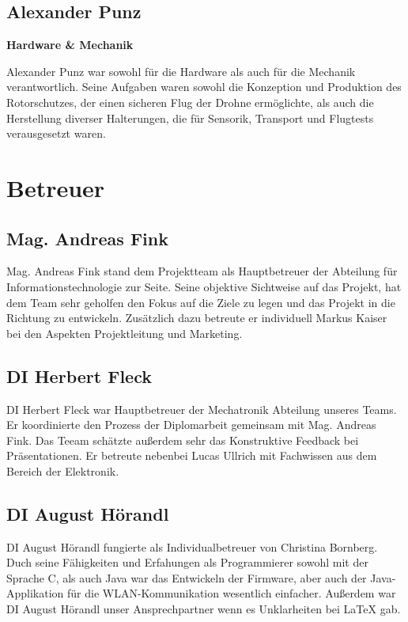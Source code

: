   \subsection*{Alexander Punz}
  \textbf{Hardware \& Mechanik}

  Alexander Punz war sowohl für die Hardware als auch für die Mechanik verantwortlich. Seine Aufgaben waren sowohl die Konzeption
  und Produktion des Rotorschutzes, der einen sicheren Flug der Drohne ermöglichte, als auch die Herstellung diverser Halterungen,
  die für Sensorik, Transport und Flugtests verausgesetzt waren.

\section{Betreuer}
  \subsection*{Mag. Andreas Fink}
  Mag. Andreas Fink stand dem Projektteam als Hauptbetreuer der Abteilung für Informationstechnologie zur Seite.
  Seine objektive Sichtweise auf das Projekt, hat dem Team sehr geholfen den Fokus auf die Ziele zu legen und
  das Projekt in die Richtung zu entwickeln.
  Zusätzlich dazu betreute er individuell Markus Kaiser bei den Aspekten Projektleitung und Marketing.

  \subsection*{DI Herbert Fleck}
  DI Herbert Fleck war Hauptbetreuer der Mechatronik Abteilung unseres Teams. Er koordinierte den Prozess der Diplomarbeit
  gemeinsam mit Mag. Andreas Fink. Das Teeam schätzte außerdem sehr das Konstruktive Feedback bei Präsentationen.
  Er betreute nebenbei Lucas Ullrich mit Fachwissen aus dem Bereich der Elektronik.

  \subsection*{DI August Hörandl}
  DI August Hörandl fungierte als Individualbetreuer von Christina Bornberg. Duch seine Fähigkeiten und
  Erfahungen als Programmierer sowohl mit der Sprache C, als auch Java war das Entwickeln der Firmware,
  aber auch der Java-Applikation für die WLAN-Kommunikation wesentlich einfacher. Außerdem war
  DI August Hörandl unser Ansprechpartner wenn es Unklarheiten bei LaTeX gab.

